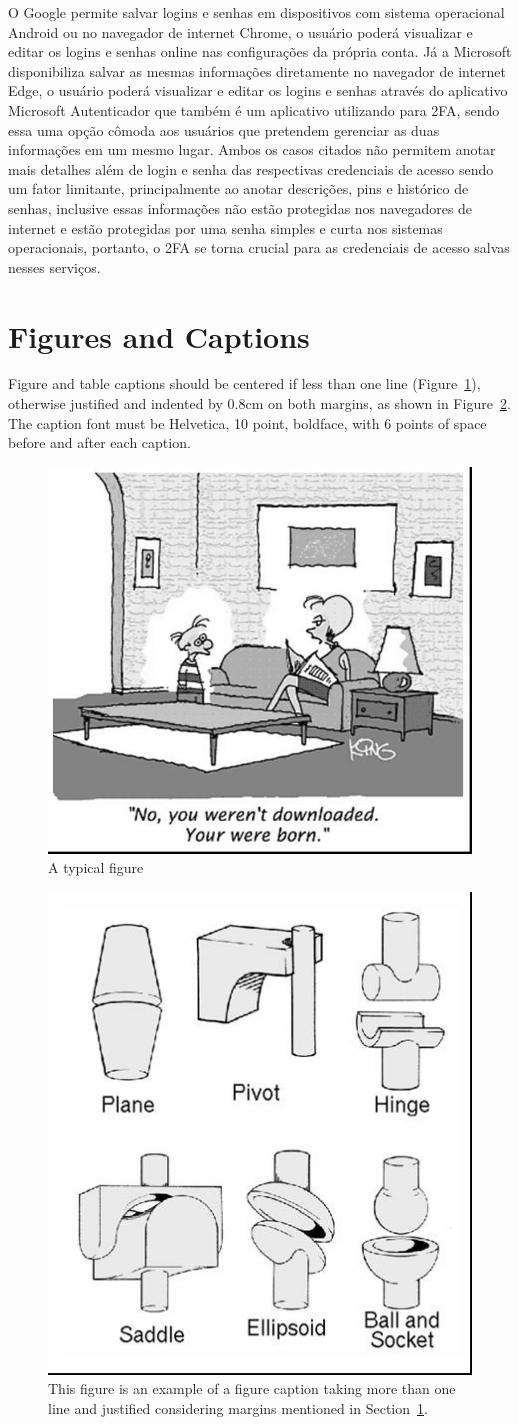 \documentclass[12pt]{article}
\begin{document}
O Google permite salvar logins e senhas em dispositivos com sistema
operacional Android ou no navegador de internet Chrome, o usuário poderá
visualizar e editar os logins e senhas online nas configurações da
própria conta.
Já a Microsoft disponibiliza salvar as mesmas informações diretamente no
navegador de internet Edge, o usuário poderá visualizar e editar os
logins e senhas através do aplicativo Microsoft Autenticador que também
é um aplicativo utilizando para 2FA, sendo essa uma opção cômoda aos
usuários que pretendem gerenciar as duas informações em um mesmo lugar.
Ambos os casos citados não permitem anotar mais detalhes além de login e
senha das respectivas credenciais de acesso sendo um fator limitante,
principalmente ao anotar descrições, pins e histórico de senhas,
inclusive essas informações não estão protegidas nos navegadores de
internet e estão protegidas por uma senha simples e curta nos sistemas
operacionais, portanto, o 2FA se torna crucial para as credenciais de
acesso salvas nesses serviços.

\section{Figures and Captions}\label{sec:figs}


Figure and table captions should be centered if less than one line
(Figure~\ref{fig:exampleFig1}), otherwise justified and indented by 0.8cm on
both margins, as shown in Figure~\ref{fig:exampleFig2}. The caption font must
be Helvetica, 10 point, boldface, with 6 points of space before and after each
caption.

\begin{figure}[ht]
\centering
\includegraphics[width=.5\textwidth]{fig1.jpg}
\caption{A typical figure}
\label{fig:exampleFig1}
\end{figure}

\begin{figure}[ht]
\centering
\includegraphics[width=.3\textwidth]{fig2.jpg}
\caption{This figure is an example of a figure caption taking more than one
  line and justified considering margins mentioned in Section~\ref{sec:figs}.}
\label{fig:exampleFig2}
\end{figure}
\end{document}
